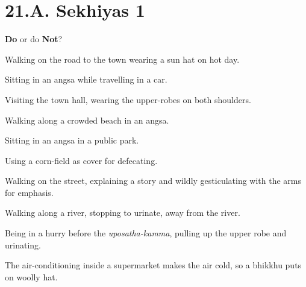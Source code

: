 \chapter{21.A. Sekhiyas 1}
\renewcommand*{\theChapterTitle}{21.A. Sekhiyas 1}

\begin{exam}{\autoExamName}

  \begin{problem*}
    \textbf{Do} or do \textbf{Not}?

    \bigskip

    \begin{parts}

    \item {} Walking on the road to the town wearing a sun hat on hot day.

    \bigskip

    \item {} Sitting in an angsa while travelling in a car.

    \bigskip

    \item {} Visiting the town hall, wearing the upper-robes on both shoulders.

    \bigskip

    \item {} Walking along a crowded beach in an angsa.

    \bigskip

    \item {} Sitting in an angsa in a public park.

    \bigskip

    \item {} Using a corn-field as cover for defecating.

    \bigskip

    \item {} Walking on the street, explaining a story and wildly gesticulating with the arms for emphasis.

    \bigskip

    \item {} Walking along a river, stopping to urinate, away from the river.

    \bigskip

    \item {} Being in a hurry before the \emph{uposatha-kamma}, pulling up the upper robe and urinating.

    \bigskip

    \item {} The air-conditioning inside a supermarket makes the air cold, so a bhikkhu puts on woolly hat.


\end{parts}
\end{problem*}
\end{exam}
